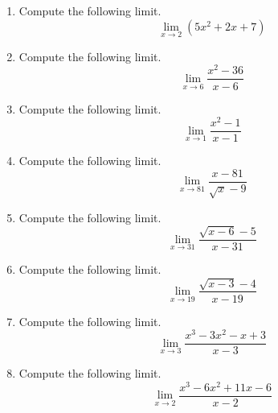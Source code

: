 \documentclass{article}
\begin{document}
\ActivityTitle[class=Calculus I, number=1, name=Limits]

\begin{enumerate}
\item Compute the following limit. \[ \lim_{x \rightarrow 2} \left( 5 x^2 + 2 x + 7 \right) \]



  
\vspace{5cm}

\item Compute the following limit. \[ \displaystyle\lim_{x \rightarrow 6} \frac{x^2 - 36}{x - 6} \]



  
\vspace{5cm}

\item Compute the following limit. \[ \lim_{x \rightarrow 1} \frac{x^2 - 1}{x - 1} \]



  
\vspace{5cm}

\item Compute the following limit. \[ \lim_{x \rightarrow 81} \frac{x - 81}{\sqrt{x} - 9} \]



  
\vspace{5cm}

\item Compute the following limit. \[ \lim_{x \rightarrow 31} \frac{\sqrt{x - 6} - 5}{x - 31} \]



  
\vspace{5cm}

\item Compute the following limit. \[ \lim_{x \rightarrow 19} \frac{\sqrt{x - 3} - 4}{x - 19} \]



  
\vspace{5cm}

\item Compute the following limit. \[ \lim_{x \rightarrow 3} \frac{x^3 - 3x^2 - x + 3}{x - 3} \]



  
\vspace{5cm}

\item Compute the following limit. \[ \lim_{x \rightarrow 2} \frac{x^3 - 6x^2 + 11x - 6}{x - 2} \]



  
\vspace{5cm}
\end{enumerate}
\end{document}
